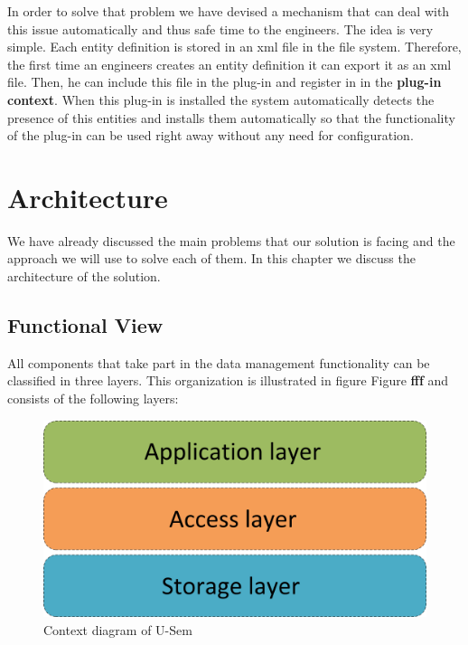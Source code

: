 \documentclass[a4paper, notitlepage]{article}
\begin{document}
In order to solve that problem we have devised a mechanism that can deal with this issue automatically and thus safe time to the engineers. The idea is very simple. Each entity definition is stored in an xml file in the file system. Therefore, the first time an engineers creates an entity definition it can export it as an xml file. Then, he can include this file in the plug-in and register in in the \textbf{plug-in context}. When this plug-in is installed the system automatically detects the presence of this entities and installs them automatically so that the functionality of the plug-in can be used right away without any need for configuration.

\section{Architecture}
We have already discussed the main problems that our solution is facing and the approach we will use to solve each of them. In this chapter we discuss the architecture of the solution.

\subsection{Functional View}

All components that take part in the data management functionality can be classified in three layers. This organization is illustrated in figure Figure \textbf{fff} and consists of the following layers:

\begin{figure}[h!]
  \centering
  	\includegraphics[scale=0.4]{functional/layers.png}
  \caption{Context diagram of U-Sem }
  \label{fig_context}
\end{figure}
\end{document}
